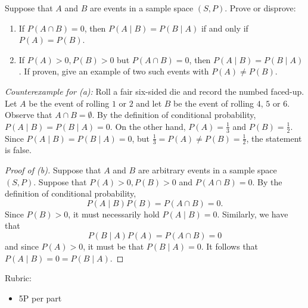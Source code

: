 \documentclass{article}
\theoremstyle{definition}
\begin{document}
\begin{question}
    Suppose that $A$ and $B$ are events in a sample space $(S,P)$.
    Prove or disprove:
    \begin{enumerate}
        \item If $P(A \cap B)=0$, then $P(A\mid B)=P(B\mid A)$ if and only
            if $P(A)=P(B)$.
        \item If $P(A)>0, P(B)>0$ but $P(A \cap B)=0$, then $P(A\mid
            B)=P(B\mid A)$.  If proven, give an example of two such events
            with $P(A) \ne P(B)$.
    \end{enumerate}
\end{question}
\begin{solution}
 \textit{Counterexample for (a):}
    Roll a fair six-sided die and record the numbed faced-up. Let $A$ be the
    event of rolling $1$ or $2$ and let $B$ be the event of rolling $4$, $5$
    or $6$.  Observe that $A \cap B = \emptyset$. By the definition of
    conditional probability, $P(A \mid B) = P(B \mid A) = 0$. On the other
    hand, $P(A) = \frac{1}{3}$ and $P(B) = \frac{1}{2}$. Since $P(A \mid B)
    = P(B \mid A) = 0$, but $\frac{1}{3} = P(A) \ne P(B) = \frac{1}{2}$, the
    statement is false.
    
\begin{proof}[Proof of (b)]
    Suppose that $A$ and $B$ are arbitrary events in a sample space $(S,P)$.
    Suppose that $P(A)>0, P(B)>0$ and $P(A \cap B)=0$.  By the definition of
    conditional probability,
    \[
        P(A \mid B)P(B) = P(A \cap B) = 0.
    \]
    Since $P(B) >0$, it must necessarily hold $P(A\mid B) = 0$.  Similarly,
    we have that
    \[
        P(B\mid A)P(A) = P(A \cap B) = 0
    \]
    and since $P(A) >0$, it must be that $P(B\mid A) = 0$. It follows that
    $P(A \mid B) = 0 = P(B \mid A)$.
\end{proof}
{\color{red} Rubric:
\begin{itemize}
\item 5P per part
\end{itemize}}
\end{solution}
\end{document}

